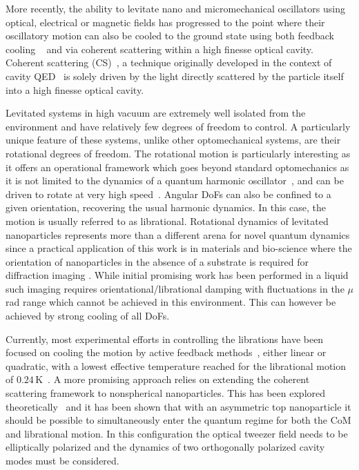 \documentclass[aps,pra,twocolumn,nopacs,superscriptaddress,groupedaddress]{revtex4}
\begin{document}
More recently, the ability to levitate nano and micromechanical oscillators using optical, electrical or magnetic fields has progressed to the point where their oscillatory motion can also be cooled to the ground state using both feedback cooling ~\cite{Magrini2021} and via coherent scattering within a high finesse optical cavity\cite{Delic2020science, marin2021}.  Coherent scattering (CS)~\cite{novotny_CS_2019,Delic_CS_2019,tania_CS_2020,tania_CS_2021}, a technique originally developed in the context of cavity QED~\cite{Vuletic2000} is solely driven by the light directly scattered by the particle itself into a high finesse optical cavity.

Levitated systems in high vacuum are extremely well isolated from the environment and have relatively few degrees of freedom to control. A particularly unique feature of these systems, unlike other optomechanical systems, are their rotational degrees of freedom. The rotational motion is particularly interesting as it offers an operational framework which goes beyond standard optomechanics as it is not limited to the dynamics of a quantum harmonic oscillator~\cite{kuhn2017,Stickler_2018,tennis,marko_precession}, and can be driven to rotate at very high speed~\cite{tongcanli_nanorotor_2018,novotny_nanorotor2020}. Angular DoFs can also be confined to a given orientation, recovering the usual harmonic dynamics. In this case, the motion is usually referred to as librational. Rotational dynamics of levitated nanoparticles represents more than a different arena for novel quantum dynamics since a  practical application of this work is in materials and bio-science where the orientation of nanoparticles in the absence of a substrate is required for diffraction imaging \cite{miao1999extending}. While initial promising work has been performed in a liquid \cite{yuan} such imaging requires orientational/librational damping with fluctuations in the $\mu$rad range which cannot be achieved in this environment. This can however be achieved by strong cooling of all DoFs.

Currently, most experimental efforts in controlling the librations have been focused on cooling the motion by active feedback methods~\cite{novotny_libration_fbk2021,tongcangli_5D}, either linear or quadratic, with a lowest effective temperature reached for the librational motion of $0.24$\,K~\cite{novotny_libration_fbk2021}. A more  promising approach relies on extending the coherent scattering framework to nonspherical nanoparticles. This has been explored theoretically~\cite{elliptic_CS_prl,elliptic_CS_pra} and it has been shown that with an asymmetric top nanoparticle it should be possible to simultaneously enter the quantum regime for both the CoM and librational motion. In this configuration the optical tweezer field needs to be elliptically polarized and the dynamics of two orthogonally polarized cavity modes must be considered.
\end{document}
